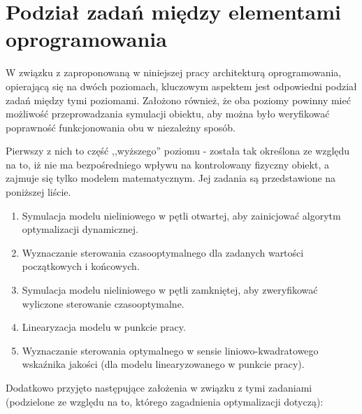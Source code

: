 \section{Podział zadań między elementami oprogramowania}
\label{sec:podzial-zadan}

W związku z zaproponowaną w niniejszej pracy architekturą oprogramowania, opierającą się na dwóch poziomach, kluczowym aspektem jest odpowiedni podział zadań między tymi poziomami. Założono również, że oba poziomy powinny mieć możliwość przeprowadzania symulacji obiektu, aby można było weryfikować poprawność funkcjonowania obu w niezależny sposób.

Pierwszy z nich to część ,,wyższego'' poziomu - została tak określona ze względu na to, iż nie ma bezpośredniego wpływu na kontrolowany fizyczny obiekt, a zajmuje się tylko modelem matematycznym. Jej zadania są przedstawione na poniższej liście.

\begin{enumerate}
    \item Symulacja modelu nieliniowego w pętli otwartej, aby zainicjować algorytm optymalizacji dynamicznej.
    \item Wyznaczanie sterowania czasooptymalnego dla zadanych wartości początkowych i końcowych.
    \item Symulacja modelu nieliniowego w pętli zamkniętej, aby zweryfikować wyliczone sterowanie czasooptymalne.
    \item Linearyzacja modelu w punkcie pracy.
    \item Wyznaczanie sterowania optymalnego w sensie liniowo-kwadratowego wskaźnika jakości (dla modelu linearyzowanego w punkcie pracy).
\end{enumerate}

Dodatkowo przyjęto następujące założenia w związku z tymi zadaniami (podzielone ze względu na to, którego zagadnienia optymalizacji dotyczą):

